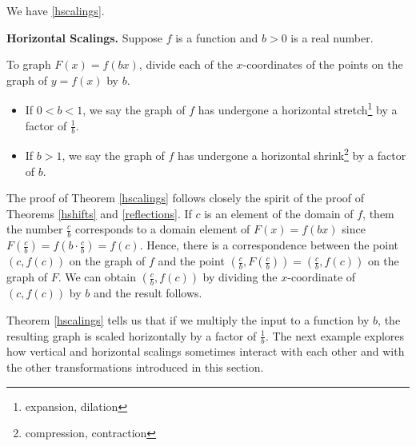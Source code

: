 We have \autoref{hscalings}.

\begin{fthm}  \label{hscalings}\textbf{Horizontal Scalings.}  Suppose $f$ is a function and $b>0$ is a real number.

To graph $F(x) = f(bx)$, divide each of the $x$-coordinates of the points on the graph of $y=f(x)$ by $b$. 


\begin{itemize}

\item If $0 < b < 1$, we say the graph of $f$ has undergone a horizontal stretch\footnote{expansion, dilation} by a factor of $\frac{1}{b}$. 

\item If $b > 1$, we say the graph of $f$ has undergone a horizontal shrink\footnote{compression, contraction} by a factor of $b$.

\end{itemize}

\end{fthm}

The proof of Theorem \ref{hscalings} follows closely the spirit of the proof of Theorems \ref{hshifts} and \ref{reflections}.  If $c$ is an element of the domain of $f$, them the number $\frac{c}{b}$ corresponds to a domain element of $F(x)= f(bx)$ since $F\left(\frac{c}{b} \right) = f\left( b \cdot \frac{c}{b} \right) = f(c)$.  Hence, there is a correspondence between the point  $(c, f(c))$ on the graph of $f$ and the point $\left( \frac{c}{b}, F\left(\frac{c}{b}\right) \right)= \left( \frac{c}{b}, f(c) \right)$ on the graph of $F$.  We can obtain    $ \left( \frac{c}{b}, f(c) \right)$ by dividing the $x$-coordinate of $(c, f(c))$ by $b$ and the result follows.  

Theorem \ref{hscalings} tells us that if we multiply the input to a function by $b$, the resulting graph is scaled horizontally by a factor of $\frac{1}{b}$.    The next example explores how vertical and horizontal scalings sometimes interact with each other and with the other transformations introduced in this section. 

